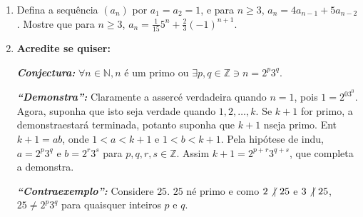 \begin{enumerate}[{\bf 1.}]
\item Defina a sequ\^encia $(a_n)$ por $a_1=a_2=1$, e para $n\geq 3$, $a_n=4a_{n-1}+5a_{n-2}$. Mostre que para $n\geq 3$, $a_n=\frac{1}{15}5^n+\frac{2}{3}(-1)^{n+1}$.

\item {\bf Acredite se quiser:}  

\noindent \textit{\textbf{Conjectura:}} $\forall n\in\mathbb{N}, n$ \'e um primo ou $\exists p,q\in\mathbb{Z} \ni n=2^p3^q$. 

\noindent \textit{\textbf{``Demonstra\caoi'':}} Claramente a asserc\ao \'e verdadeira quando $n=1$, pois $1=2^03^0$. Agora, suponha que isto seja verdade quando $1,2,\ldots,k$. Se $k+1$ for primo, a demonstra\cao estar\'a terminada, potanto suponha que $k+1$ n\ao seja primo. Ent\ao $k+1=ab$, onde $1<a<k+1$ e $1<b<k+1$. Pela hip\'otese de indu\caoi, $a=2^p3^q$ e $b=2^r3^s$ para $p,q,r,s\in\mathbb{Z}$. Assim $k+1=2^{p+r}3^{q+s}$, que completa a demonstra\caoi.

\noindent \textit{\textbf{``Contraexemplo'':}} Considere $25$. $25$ n\ao \'e primo e como $2\not|\textrm{ } 25$ e $3\not|\textrm{ } 25$, $25\neq 2^p3^q$ para quaisquer inteiros $p$ e $q$.
\end{enumerate}
